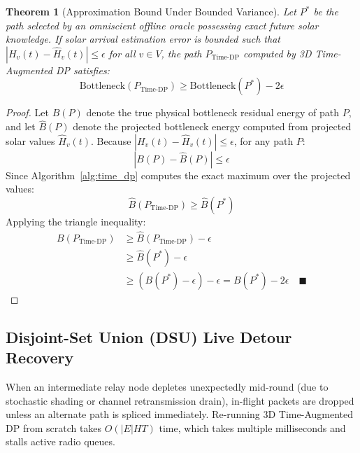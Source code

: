 \documentclass[journal]{IEEEtran}
\newtheorem{theorem}{Theorem}
\begin{document}
\begin{theorem}[Approximation Bound Under Bounded Variance]
Let $P^*$ be the path selected by an omniscient offline oracle possessing exact future solar knowledge. If solar arrival estimation error is bounded such that $|H_v(t) - \hat{H}_v(t)| \le \epsilon$ for all $v \in V$, the path $P_{\text{Time-DP}}$ computed by 3D Time-Augmented DP satisfies:
\begin{equation}
\text{Bottleneck}(P_{\text{Time-DP}}) \ge \text{Bottleneck}(P^*) - 2\epsilon
\end{equation}
\end{theorem}
\begin{proof}
Let $B(P)$ denote the true physical bottleneck residual energy of path $P$, and let $\hat{B}(P)$ denote the projected bottleneck energy computed from projected solar values $\hat{H}_v(t)$.
Because $|H_v(t) - \hat{H}_v(t)| \le \epsilon$, for any path $P$:
\begin{equation}
|B(P) - \hat{B}(P)| \le \epsilon
\end{equation}
Since Algorithm~\ref{alg:time_dp} computes the exact maximum over the projected values:
\begin{equation}
\hat{B}(P_{\text{Time-DP}}) \ge \hat{B}(P^*)
\end{equation}
Applying the triangle inequality:
\begin{align}
B(P_{\text{Time-DP}}) &\ge \hat{B}(P_{\text{Time-DP}}) - \epsilon \\
&\ge \hat{B}(P^*) - \epsilon \\
&\ge (B(P^*) - \epsilon) - \epsilon = B(P^*) - 2\epsilon \quad \blacksquare
\end{align}
\end{proof}

\subsection{Disjoint-Set Union (DSU) Live Detour Recovery}
When an intermediate relay node depletes unexpectedly mid-round (due to stochastic shading or channel retransmission drain), in-flight packets are dropped unless an alternate path is spliced immediately. Re-running 3D Time-Augmented DP from scratch takes $O(|E|HT)$ time, which takes multiple milliseconds and stalls active radio queues.
\end{document}
